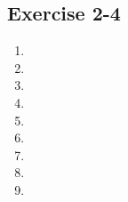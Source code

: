 
\subsection{Exercise 2-4} %
\begin{enumerate}[noitemsep, label=\textbf{\arabic*}. ] 
\item %
\item %
\item %
\item %
\item %
\item %
\item %
\item %
\item %
       
\end{enumerate}
